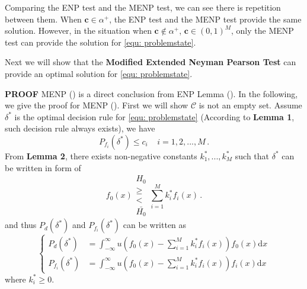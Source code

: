 Comparing the ENP test and the MENP test, we can see there is repetition between them. When $\mathbf{c} \in   \alpha^+$, the ENP test and the MENP test provide the same solution. However, in the situation when $\mathbf{c} \notin \alpha^+$, $\mathbf{c} \in (0, 1)^M$, only the MENP test can provide the solution for \eqref{equ: problemstate}. 

Next we will show that the \textbf{Modified Extended Neyman Pearson Test} can provide an optimal solution for \eqref{equ: problemstate}.

\textbf{PROOF}
MENP () is a direct conclusion from ENP Lemma (). In the following,  we give the proof for MENP (). First we will show $\mathcal{C}$ is not an empty set. 
Assume $\delta^\ast$ is the optimal decision rule for \eqref{equ: problemstate} (According to \textbf{Lemma 1}, such decision rule always exists), we have  
\begin{equation}
\label{condition 1}
P_{f_i}(\delta^\ast) \leq c_i\;\;\;\;i=1, 2, ..., M\,.
\end{equation}
From \textbf{Lemma 2}, there exists non-negative constants $k_1^\ast, ..., k_M^\ast$ such that $\delta^\ast$ can be written in form of 
\begin{equation}
f_0(x) \substack{H_0 \\ \geq \\ < \\ \bar{H_0}} \sum_{i=1}^{M}k_i^\ast f_i(x)\,.
\label{2015feb20a1}
\end{equation}
and thus $P_d(\delta^\ast)$ and $P_{f_i}(\delta^\ast)$ can be written as
\begin{equation}
\begin{cases}
\label{TEMP10}
P_{d}(\delta^\ast) &= \int_{-\infty}^{\infty} u(f_0(x) - \sum_{i=1}^{M}k_i^\ast f_i(x)) f_0(x) \mathrm{d}x\\
P_{f_i}(\delta^\ast) &= \int_{-\infty}^{\infty} u(f_0(x) - \sum_{i=1}^{M}k_i^\ast f_i(x)) f_i(x) \mathrm{d}x
\end{cases}
\end{equation}
where $k_i^\ast \geq 0$.

